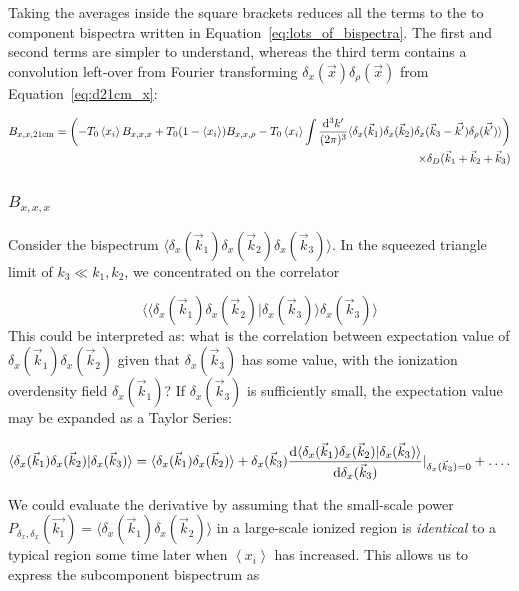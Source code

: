 Taking the averages inside the square brackets reduces all the terms to the to component bispectra written in Equation~\ref{eq:lots_of_bispectra}. The first and second terms are simpler to understand, whereas the third term contains a convolution left-over from Fourier transforming $\delta_x(\vec{x})\delta_{\rho}(\vec{x})$ from Equation~\ref{eq:d21cm_x}:

\begin{equation}
\begin{split}
B_{x,x,{\rm 21cm}} = \left( -T_0 \left\langle x_i \right\rangle B_{x,x,x} + T_0(1-\left\langle x_i \right\rangle) B_{x,x,\rho} - T_0 \left\langle x_i \right\rangle \int \frac{{\rm d^3}k'}{(2\pi)^3}
\langle \delta_x(\vec{k}_1) \delta_x(\vec{k}_2) \delta_x(\vec{k}_3 - \vec{k'})\delta_{\rho}(\vec{k'}) \rangle \right)\\
\times \delta_D(\vec{k}_1+\vec{k}_2+\vec{k}_3)
\end{split}
\end{equation}

\subsubsection*{$B_{x,x,x}$}
\label{subsubsec:Bxxx}
Consider the bispectrum $\langle\delta_x(\vec{k}_1)\delta_x(\vec{k}_2)\delta_x(\vec{k}_3)\rangle$. In the squeezed triangle limit of $k_3 \ll k_1, k_2$, we concentrated on the correlator

\begin{equation}
\langle \langle \delta_x(\vec{k}_1)\delta_x(\vec{k}_2) | \delta_x(\vec{k}_3)\rangle \delta_x(\vec{k}_3) \rangle
\end{equation}
This could be interpreted as: what is the correlation between expectation value of $\delta_x(\vec{k}_1)\delta_x(\vec{k}_2)$ given that $\delta_x(\vec{k}_3)$ has some value, with the ionization overdensity field $\delta_x(\vec{k}_1)$? If $\delta_x(\vec{k}_3)$ is sufficiently small, the expectation value may be expanded as a Taylor Series:

\begin{equation}
\langle \delta_x(\vec{k}_1)\delta_x(\vec{k}_2) | \delta_x(\vec{k}_3)\rangle =
\langle \delta_x(\vec{k}_1)\delta_x(\vec{k}_2) \rangle + 
\delta_x(\vec{k}_3) \frac{{\rm d}\langle\delta_x(\vec{k}_1)\delta_x(\vec{k}_2) | \delta_x(\vec{k}_3)\rangle}{{\rm d}\delta_x(\vec{k}_3)}|_{\delta_x(\vec{k}_3)=0} + \ldots.
\end{equation}

We could evaluate the derivative by assuming that the small-scale power $P_{\delta_x,\delta_x}(\vec{k_1}) = \langle \delta_x(\vec{k}_1)\delta_x(\vec{k}_2) \rangle$ in a large-scale ionized region is \textit{identical} to a typical region some time later when $\left\langle x_i \right\rangle$ has increased. This allows us to express the subcomponent bispectrum as 

